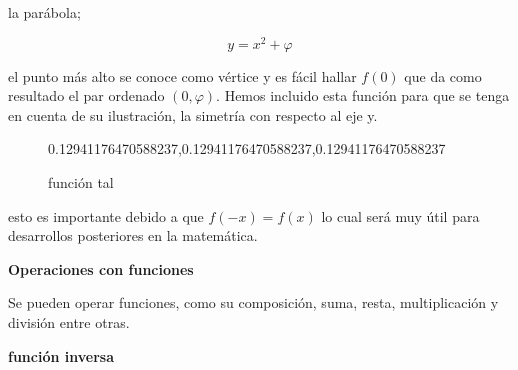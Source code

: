 \documentclass[12pt]{article}
\begin{document}
 



\newpage


la parábola; 

$$ y= x^{2} + \varphi $$

el punto más alto se conoce como vértice y es fácil hallar $f(0)$ que da como resultado el par ordenado $(0,\varphi)$. Hemos incluido esta función para que se tenga en cuenta de su ilustración, la simetría con respecto al eje  y.

\begin{figure}

\begin{center}

\definecolor{qqwuqq}{rgb}
{0.12941176470588237,0.12941176470588237,0.12941176470588237}
\label{fig 1}

\caption{función tal}



\end{center}

\end{figure}


esto es importante debido a que $f(-x)=f(x)$ lo cual será muy útil para desarrollos posteriores en la matemática.



\textbf{Operaciones con funciones}

Se pueden operar funciones, como su composición, suma, resta, multiplicación y división entre otras.









\textbf{función inversa}
\end{document}
